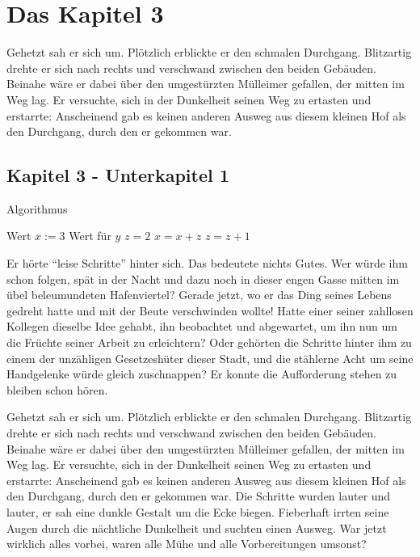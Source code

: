 
\chapter{Das Kapitel 3}
\label{Kapitel 3}
%
Gehetzt sah er sich um. Plötzlich erblickte er den schmalen
Durchgang. Blitzartig drehte er sich nach rechts und verschwand
zwischen den beiden Gebäuden. Beinahe wäre er dabei über den
umgestürzten Mülleimer gefallen, der mitten im Weg lag. Er
versuchte, sich in der Dunkelheit seinen Weg zu ertasten und
erstarrte: Anscheinend gab es keinen anderen Ausweg aus diesem
kleinen Hof als den Durchgang, durch den er gekommen war.

\section{Kapitel 3 - Unterkapitel 1}
\label{Kapitel_3_-_Unterkapitel_1}
%
    \begin{algorithm}[t]
    \centering
    \caption[Ein Algorithmus]{Algorithmus} \label{algo_1}
    \begin{algorithmic}
    \REQUIRE Wert $x :=3$
    \ENSURE Wert für $y$
    \STATE $z = 2$
    \STATE $x = x + z$
    \STATE $z = z + 1$
    \ENDFOR
    \ENDWHILE
    \end{algorithmic}
    \end{algorithm}


Er hörte \enquote{leise Schritte} hinter sich. Das bedeutete
nichts Gutes. Wer würde ihm schon folgen, spät in der Nacht und
dazu noch in dieser engen Gasse mitten im übel beleumundeten
Hafenviertel? Gerade jetzt, wo er das Ding seines Lebens gedreht
hatte und mit der Beute verschwinden wollte! Hatte einer seiner
zahllosen Kollegen dieselbe Idee gehabt, ihn beobachtet und
abgewartet, um ihn nun um die Früchte seiner Arbeit zu
erleichtern? Oder gehörten die Schritte hinter ihm zu einem der
unzähligen Gesetzeshüter dieser Stadt, und die stählerne Acht um
seine Handgelenke würde gleich zuschnappen? Er konnte die
Aufforderung stehen zu bleiben
schon hören.

Gehetzt sah er sich um. Plötzlich erblickte er den schmalen
Durchgang. Blitzartig drehte er sich nach rechts und verschwand
zwischen den beiden Gebäuden. Beinahe wäre er dabei über den
umgestürzten Mülleimer gefallen, der mitten im Weg lag. Er
versuchte, sich in der Dunkelheit seinen Weg zu ertasten und
erstarrte: Anscheinend gab es keinen anderen Ausweg aus diesem
kleinen Hof als den Durchgang, durch den er gekommen war. Die
Schritte wurden lauter und lauter, er sah eine dunkle Gestalt um
die Ecke biegen. Fieberhaft irrten seine Augen durch die
nächtliche Dunkelheit und suchten einen Ausweg. War jetzt wirklich
alles vorbei, waren alle Mühe und alle Vorbereitungen umsonst?

